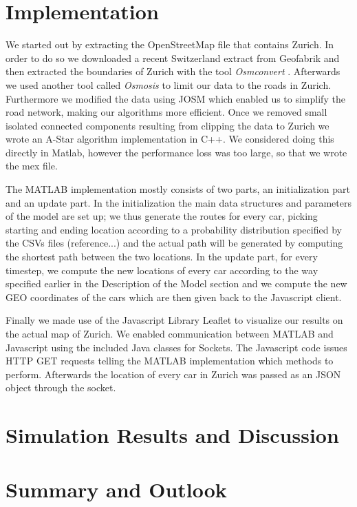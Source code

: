 \documentclass[11pt]{article}
\begin{document}
\section{Implementation}
We started out by extracting the OpenStreetMap file that contains Zurich.
In order to do so we downloaded a recent Switzerland extract from Geofabrik \cite{geofab} and then extracted the boundaries of Zurich with the tool \emph{Osmconvert} \cite{osmconv}.
Afterwards we used another tool called \emph{Osmosis} to limit our data to the roads in Zurich.
Furthermore we modified the data using JOSM which enabled us to simplify the road network, making our algorithms more efficient.
Once we removed small isolated connected components resulting from clipping the data to Zurich we wrote an A-Star algorithm implementation in C++.
We considered doing this directly in Matlab, however the performance loss was too large, so that we wrote the mex file.

The MATLAB implementation mostly consists of two parts, an initialization part and an update part. In the initialization the main data structures and parameters of the model are set up; we thus generate the routes for every car, picking starting and ending location according to a probability distribution specified by the CSVs files (reference...) and the actual path will be generated by computing the shortest path between the two locations. In the update part, for every timestep, we compute the new locations of every car according to the way specified earlier in the Description of the Model section and we compute the new GEO coordinates of the cars which are then given back to the Javascript client.


Finally we made use of the Javascript Library Leaflet to visualize our results on the actual map of Zurich.
We enabled communication between MATLAB and Javascript using the included Java classes for Sockets.
The Javascript code issues HTTP GET requests telling the MATLAB implementation which methods to perform.
Afterwards the location of every car in Zurich was passed as an JSON object through the socket.


\section{Simulation Results and Discussion}

\section{Summary and Outlook}


\newpage
\printbibliography
\end{document}
